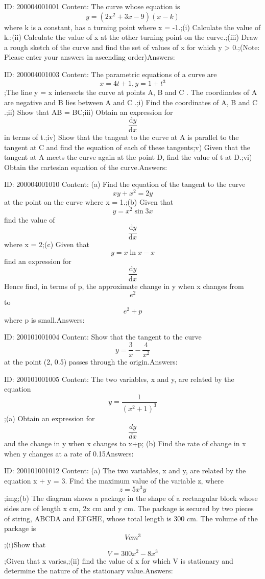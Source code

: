 \documentclass{article}
\begin{document}
ID: 200004001001
Content:
The curve whose equation is \[y=(2x^2+3x-9)(x-k)\] where k is a constant, has a turning point where x = -1.;(i)	Calculate the value of k.;(ii)	Calculate the value of x at the other turning point on the curve.;(iii)	Draw a rough sketch of the curve and find the set of values of x for which y > 0.;(Note: Please enter your answers in ascending order)Answers:

ID: 200004001003
Content:
The parametric equations of a curve are \[x=4t+1,y=1+t^3\];The line y = x intersects the curve at points A, B and C . The coordinates of A are negative and B lies between A and C .;i) Find the coordinates of A, B and C .;ii) Show that AB = BC;iii) Obtain an expression for \[\frac{\mathrm{d} y}{\mathrm{d} x}\] in terms of t.;iv) Show that the tangent to the curve at A is parallel to the tangent at C and find the equation of each of these tangents;v) Given that the tangent at A meets the curve again at the point D, find the value of t at D.;vi) Obtain the cartesian equation of the curve.Answers:

ID: 200004001010
Content:
(a)	Find the equation of the tangent to the curve \[xy+x^2=2y\] at the point on the curve where x = 1.;(b)	Given that \[y=x^2\sin3x\] find the value of \[\frac{\mathrm{d} y}{\mathrm{d} x}\] where x = 2;(c)	Given that \[y= x\ln x - x\] find an expression for \[\frac{\mathrm{d} y}{\mathrm{d} x}\]  Hence find, in terms of p, the approximate change in y when x changes from \[e^2\] to \[e^2+p\] where p is small.Answers:

ID: 200101001004
Content:
Show that the tangent to the curve \[y=\frac{3}{x}-\frac{4}{x^{2}}\] at the point (2, 0.5) passes through the origin.Answers:

ID: 200101001005
Content:
The two variables, x and y, are related by the equation \[y=\frac{1}{(x^2+1)^3}\];(a) Obtain an expression for $$\frac{dy}{dx}$$ and the change in y when x changes to x+p; (b) Find the rate of change in x when y changes at a rate of 0.15Answers:

ID: 200101001012
Content:
(a)	The two variables, x and y, are related by the equation x + y = 3. Find the maximum value of the variable z, where \[z=5x^3y\];img;(b) The diagram shows a package in the shape of a rectangular block whose sides are of length x cm, 2x cm and y cm. The package is secured by two pieces of string, ABCDA and EFGHE, whose total length is 300 cm. The volume of the package is \[V cm^3\];(i)Show that \[V=300x^2-8x^3\];Given that x varies,;(ii)	find the value of x for which V is stationary and determine the nature of the stationary value.Answers:
\end{document}
